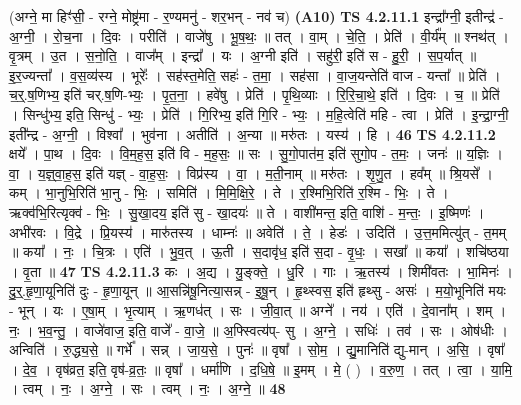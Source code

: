 \documentclass[17pt]{extarticle}
\begin{document}
                  \newline
                      (अग्ने॒ मा हिꣳ॑सी॒ - रग्ने॒ मोष्ट्र॑मा - र॒ण्यमनु॑ - शर॒भन् - नव॑ च)  \textbf{(A10)} \newline \newline
                                \textbf{ TS 4.2.11.1} \newline
                  इन्द्रा᳚ग्नी॒ इतीन्द्र॑ - अ॒ग्नी॒ । रो॒च॒ना । दि॒वः । परीति॑ । वाजे॑षु । भू॒ष॒थः॒ ॥ तत् । वा॒म् । चे॒ति॒ । प्रेति॑ । वी॒र्य᳚म् ॥ श्नथ॑त् । वृ॒त्रम् । उ॒त । स॒नो॒ति॒ । वाज᳚म् । इन्द्रा᳚ । यः । अ॒ग्नी इति॑ । सहु॑री॒ इति॑ स - हु॒री॒ । स॒प॒र्यात् ॥ इ॒र॒ज्यन्ता᳚ । व॒स॒व्य॑स्य । भूरेः᳚ । सह॑स्त॒मेति॒ सहः॑ - त॒मा॒ । सह॑सा । वा॒ज॒यन्तेति॑ वाज - यन्ता᳚ ॥ प्रेति॑ । च॒र्॒.ष॒णिभ्य॒ इति॑ चर्.ष॒णि-भ्यः॒ । पृ॒त॒ना॒ । हवे॑षु । प्रेति॑ । पृ॒थि॒व्याः । रि॒रि॒चा॒थे॒ इति॑ । दि॒वः । च॒ ॥ प्रेति॑ । सिन्धु॑भ्य॒ इति॒ सिन्धु॑ - भ्यः॒ । प्रेति॑ । गि॒रिभ्य॒ इति॑ गि॒रि - भ्यः॒ । म॒हि॒त्वेति॑ महि - त्वा । प्रेति॑ । इ॒न्द्रा॒ग्नी॒ इती᳚न्द्र - अ॒ग्नी॒ । विश्वा᳚ । भुव॑ना । अतीति॑ । अ॒न्या ॥ मरु॑तः । यस्य॑ । हि । \textbf{  46 } \newline
                  \newline
                                \textbf{ TS 4.2.11.2} \newline
                  क्षये᳚ । पा॒थ । दि॒वः । वि॒म॒ह॒स॒ इति॑ वि - म॒ह॒सः॒ ॥ सः । सु॒गो॒पात॑म॒ इति॑ सुगो॒प - त॒मः॒ । जनः॑ ॥ य॒ज्ञिः । वा॒ । य॒ज्ञ्॒वा॒ह॒स॒ इति॑ यज्ञ् - वा॒ह॒सः॒ । विप्र॑स्य । वा॒ । म॒ती॒नाम् ॥ मरु॑तः । शृ॒णु॒त । हव᳚म् ॥ श्रि॒यसे᳚ । कम् । भा॒नुभि॒रिति॑ भा॒नु - भिः॒ । समिति॑ । मि॒मि॒क्षि॒रे॒ । ते । र॒श्मिभि॒रिति॑ र॒श्मि - भिः॒ । ते । ऋक्व॑भि॒रित्यृक्व॑ - भिः॒ । सु॒खा॒दय॒ इति॑ सु - खा॒दयः॑ ॥ ते । वाशी॑मन्त॒ इति॒ वाशि॑ - म॒न्तः॒ । इ॒ष्मिणः॑ । अभी॑रवः । वि॒द्रे । प्रि॒यस्य॑ । मारु॑तस्य । धाम्नः॑ ॥ अवेति॑ । ते॒ । हेडः॑ । उदिति॑ । उ॒त्त॒ममित्यु॑त् - त॒मम् ॥ कया᳚ । नः॒ । चि॒त्रः । एति॑ । भु॒व॒त् । ऊ॒ती । स॒दावृ॑ध॒ इति॑ स॒दा - वृ॒धः॒ । सखा᳚ ॥ कया᳚ । शचि॑ष्ठया । वृ॒ता ॥ \textbf{  47} \newline
                  \newline
                                \textbf{ TS 4.2.11.3} \newline
                  कः । अ॒द्य । यु॒ङ्क्ते॒ । धु॒रि । गाः । ऋ॒तस्य॑ । शिमी॑वतः । भा॒मिनः॑ । दु॒र्॒.हृ॒णा॒यूनिति॑ दुः - हृ॒णा॒यून् ॥ आ॒सन्नि॑षू॒नित्या॒सन्न् - इ॒षू॒न् । हृ॒थ्स्वस॒ इति॑ हृथ्सु - असः॑ । म॒यो॒भूनिति॑ मयः - भून् । यः । ए॒षा॒म् । भृ॒त्याम् । ऋ॒णध॑त् । सः । जी॒वा॒त् ॥ अग्ने᳚ । नय॑ । एति॑ । दे॒वाना᳚म् । शम् । नः॒ । भ॒व॒न्तु॒ । वाजे॑वाज॒ इति॒ वाजे᳚ - वा॒जे॒ ॥ अ॒फ्स्वित्य॑प्- सु । अ॒ग्ने॒ । सधिः॑ । तव॑ । सः । ओष॑धीः । अन्विति॑ । रु॒द्ध्य॒से॒ ॥ गर्भे᳚ । सन्न् । जा॒य॒से॒ । पुनः॑ ॥ वृषा᳚ । सो॒म॒ । द्यु॒मानिति॑ द्यु-मान् । अ॒सि॒ । वृषा᳚ । दे॒व॒ । वृष॑व्रत॒ इति॒ वृष॑-व्र॒तः॒ ॥ वृषा᳚ । धर्मा॑णि । द॒धि॒षे॒ ॥ इ॒मम् । मे॒ ( ) । व॒रु॒ण॒ । तत् । त्वा॒ । या॒मि॒ । त्वम् । नः॒ । अ॒ग्ने॒ । सः । त्वम् । नः॒ । अ॒ग्ने॒ ॥ \textbf{  48 } \newline
\end{document}
